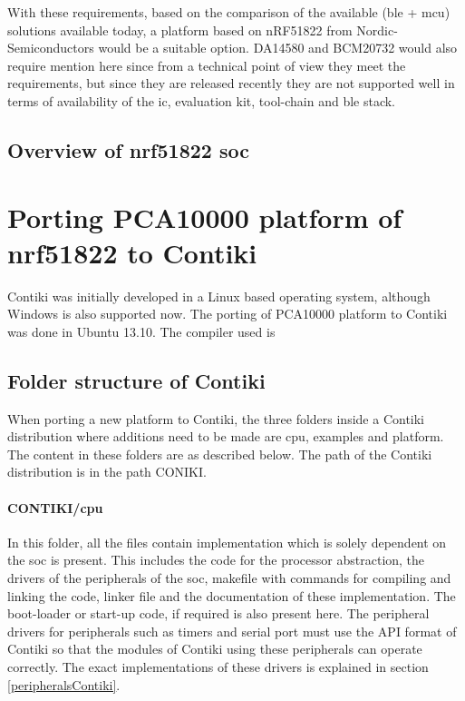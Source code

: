 With these requirements, based on the comparison  of the available (\gls{ble} + \gls{mcu}) solutions available today, a platform based on nRF51822 from Nordic-Semiconductors would be a suitable option. 
DA14580 and BCM20732 would also require mention here since from a technical point of view they meet the requirements, but since they are released recently they are not supported well in terms of availability of the \gls{ic}, evaluation kit, tool-chain and \gls{ble} stack.

\subsection{Overview of nrf51822 \gls{soc}}

\section{Porting PCA10000 platform of nrf51822 to Contiki}
Contiki was initially developed in a Linux based operating system, although Windows is also supported now. The porting of PCA10000 platform to Contiki was done in Ubuntu 13.10. The compiler used is 

\subsection{Folder structure of Contiki}
When porting a new platform to Contiki, the three folders inside a Contiki distribution where additions need to be made are cpu, examples and platform. The content in these folders are as described below. The path of the Contiki distribution is in the path CONIKI.

\paragraph{CONTIKI/cpu}In this folder, all the files contain implementation which is solely dependent on the \gls{soc} is present. This includes the code for the processor abstraction, the drivers of the peripherals of the \gls{soc}, makefile with commands for compiling and linking the code, linker file and the documentation of these implementation. The boot-loader  or start-up code, if required is also present here. The peripheral drivers for peripherals such as timers and serial port must use the API format of Contiki so that the modules of Contiki using these peripherals can operate correctly. The exact implementations of these drivers is explained in section \ref{peripheralsContiki}. 

